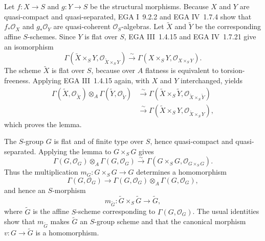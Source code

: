 Let \(f:X\to S\) and \(g:Y\to S\) be the structural morphisms.
Because \(X\) and \(Y\) are quasi-compact and quasi-separated,
EGA I~9.2.2 and EGA IV~1.7.4 show that
\(f_*\mathcal O_X\) and \(g_*\mathcal O_Y\) are quasi-coherent
\(\mathcal O_S\)-algebras. Let \(\widetilde X\) and \(\widetilde Y\)
be the corresponding affine \(S\)-schemes. Since \(Y\) is flat over
\(S\), EGA III~1.4.15 and EGA IV~1.7.21 give an isomorphism
\[
 \Gamma(\widetilde X\times_SY,
        \mathcal O_{\widetilde X\times_SY})
 \xrightarrow{\sim}
 \Gamma(X\times_SY,\mathcal O_{X\times_SY}).
\]
The scheme \(\widetilde X\) is flat over \(S\), because over \(A\)
flatness is equivalent to torsion-freeness. Applying EGA III~1.4.15
again, with \(X\) and \(Y\) interchanged, yields
\[
\begin{aligned}
 \Gamma(\widetilde X,\mathcal O_{\widetilde X})
 \otimes_A\Gamma(\widetilde Y,\mathcal O_{\widetilde Y})
 &\xrightarrow{\sim}
 \Gamma(\widetilde X\times_S\widetilde Y,
        \mathcal O_{\widetilde X\times_S\widetilde Y})\\
 &\xrightarrow{\sim}
 \Gamma(\widetilde X\times_SY,
        \mathcal O_{\widetilde X\times_SY}),
\end{aligned}
\]
which proves the lemma.

The \(S\)-group \(G\) is flat and of finite type over \(S\), hence
quasi-compact and quasi-separated. Applying the lemma to
\(G\times_SG\) gives
\[
 \Gamma(G,\mathcal O_G)\otimes_A\Gamma(G,\mathcal O_G)
 \xrightarrow{\sim}
 \Gamma(G\times_SG,\mathcal O_{G\times_SG}).
\]
Thus the multiplication \(m_G:G\times_SG\to G\) determines a
homomorphism
\[
 \Gamma(G,\mathcal O_G)\longrightarrow
 \Gamma(G,\mathcal O_G)\otimes_A\Gamma(G,\mathcal O_G),
\]
and hence an \(S\)-morphism
\[
  m_{\widetilde G}:\widetilde G\times_S\widetilde G
  \longrightarrow\widetilde G,
\]
where \(\widetilde G\) is the affine \(S\)-scheme corresponding to
\(\Gamma(G,\mathcal O_G)\). The usual identities show that
\(m_{\widetilde G}\) makes \(\widetilde G\) an \(S\)-group scheme and
that the canonical morphism \(v:G\to\widetilde G\) is a homomorphism.


